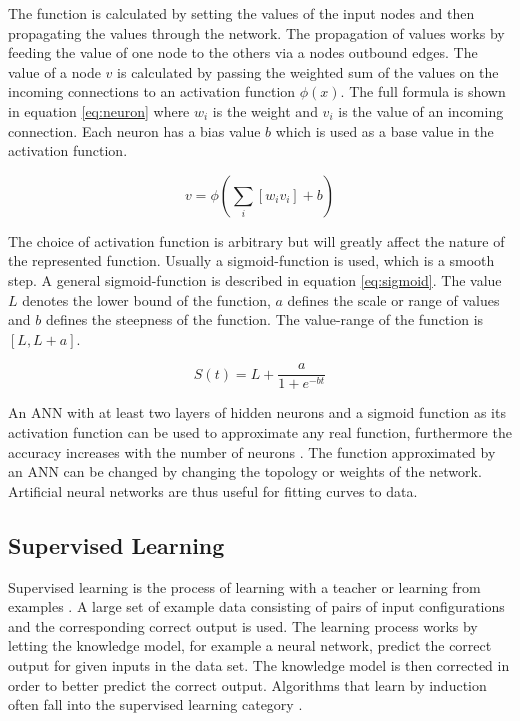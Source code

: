 The function is calculated by setting the values of the input nodes and then propagating the values through the network. The propagation of values works by feeding the value of one node to the others via a nodes outbound edges. The value of a node $v$ is calculated by passing the weighted sum of the values on the incoming connections to an activation function $\phi(x)$. The full formula is shown in equation \ref{eq:neuron} where $w_i$ is the weight and $v_i$ is the value of an incoming connection. Each neuron has a bias value $b$ which is used as a base value in the activation function.  

\begin{equation}
    v = \phi (\sum_i{[w_i v_i]} + b)
    \label{eq:neuron}
\end{equation}


\noindent
The choice of activation function is arbitrary but will greatly affect the nature of the represented function. Usually a sigmoid-function is used, which is a smooth step. A general sigmoid-function is described in equation \ref{eq:sigmoid}. The value $L$ denotes the lower bound of the function, $a$ defines the scale or range of values and $b$ defines the steepness of the function. The value-range of the function is $[L, L+a]$.  

\begin{equation}
    S(t) = L + \frac{a}{1 + e^{-bt}}
    \label{eq:sigmoid}
\end{equation}

\noindent
An ANN with at least two layers of hidden neurons and a sigmoid function as its activation function can be used to approximate any real function, furthermore the accuracy increases with the number of neurons \cite{mitchel:approximation}. The function approximated by an ANN can be changed by changing the topology or weights of the network. Artificial neural networks are thus useful for fitting curves to data. 

\subsection{Supervised Learning}
Supervised learning is the process of learning with a teacher or learning from examples \cite{haykin}. A large set of example data consisting of pairs of input configurations and the corresponding correct output is used. The learning process works by letting the knowledge model, for example a neural network, predict the correct output for given inputs in the data set. The knowledge model is then corrected in order to better predict the correct output. Algorithms that learn by induction often fall into the supervised learning category \cite{glossary}. 

